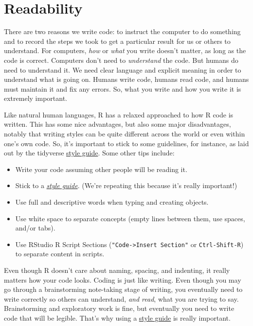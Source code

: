 \documentclass[]{Nemilov}
\providecommand{\tightlist}{%
  \setlength{\itemsep}{0pt}\setlength{\parskip}{0pt}}
\begin{document}
\hypertarget{r-reproducibility-readability}{%
\section{Readability}\label{r-reproducibility-readability}}

There are two reasons we write code: to instruct the computer to do something and
to record the steps we took to get a particular result for us or others to
understand. For computers, \emph{how} or \emph{what} you write doesn't matter, as long as
the code is correct. Computers don't need to \emph{understand} the code. But humans
do need to understand it. We need clear language and explicit meaning in order
to understand what is going on. Humans write code, humans read code, and humans
must maintain it and fix any errors. So, what you write and how you write it
is extremely important.

Like natural human languages, R has a relaxed approached to how R code is written.
This has some nice advantages, but also some major disadvantages, notably that
writing styles can be quite different across the world or even within one's own
code. So, it's important to stick to some guidelines, for instance, as laid out
by the tidyverse \href{https://style.tidyverse.org/}{style guide}. Some other tips include:

\begin{itemize}
\tightlist
\item
  Write your code assuming other people will be reading it.
\item
  Stick to a \emph{\href{https://style.tidyverse.org/}{style guide}}. (We're repeating this because it's
  really important!)
\item
  Use full and descriptive words when typing and creating objects.
\item
  Use white space to separate concepts (empty lines between them, use spaces,
  and/or tabs).
\item
  Use RStudio R Script Sections (\texttt{"Code-\textgreater{}Insert\ Section"} or \texttt{Ctrl-Shift-R}) to
  separate content in scripts.
\end{itemize}

Even though R doesn't care about naming, spacing, and indenting, it really
matters how your code looks. Coding is just like writing. Even though you may go
through a brainstorming note-taking stage of writing, you eventually need to
write correctly so others can understand, \emph{and read}, what you are trying to
say. Brainstorming and exploratory work is fine, but eventually you need to
write code that will be legible. That's why using a \href{https://style.tidyverse.org/}{style guide}
is really important.
\end{document}
